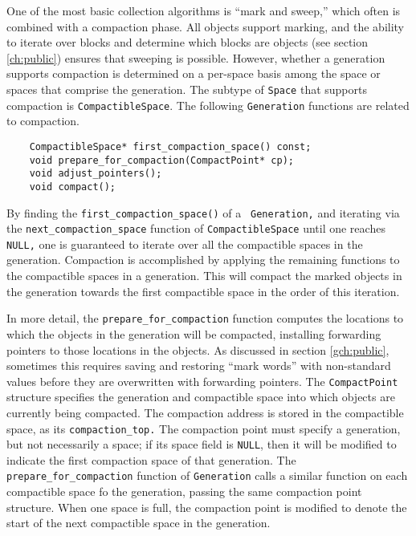 \documentclass{article}
\begin{document}
One of the most basic collection algorithms is ``mark and sweep,''
which often is combined with a compaction phase.  All objects support
marking, and the ability to iterate over blocks and determine which
blocks are objects (see section \ref{ch:public}) ensures that sweeping
is possible.  However, whether a generation supports compaction is
determined on a per-space basis among the space or spaces that
comprise the generation.  The subtype of {\tt Space} that supports
compaction is {\tt CompactibleSpace}.  The following {\tt Generation}
functions are related to compaction.
\begin{verbatim}
    CompactibleSpace* first_compaction_space() const;
    void prepare_for_compaction(CompactPoint* cp);
    void adjust_pointers();
    void compact();
\end{verbatim}
By finding the {\tt first\_compaction\_space()} of a {\tt
Generation,} and iterating via the {\tt next\_compaction\_space}
function of {\tt CompactibleSpace} until one reaches {\tt NULL,} one
is guaranteed to iterate over all the compactible spaces in the
generation.  Compaction is accomplished by applying the remaining
functions to the compactible spaces in a generation.  This will compact
the marked objects in the generation towards the first compactible
space in the order of this iteration.

In more detail, the {\tt prepare\_for\_compaction} function computes the
locations to which the objects in the generation will be compacted,
installing forwarding pointers to those locations in the objects.  As
discussed in section \ref{gch:public}, sometimes this requires saving
and restoring ``mark words'' with non-standard values before they are
overwritten with forwarding pointers.    The {\tt CompactPoint} structure specifies the
generation and compactible space into which objects are currently being
compacted.  The compaction address is stored in the compactible space,
as its {\tt compaction\_top.}    The compaction point must specify a generation, but not
necessarily a space; if its space field is {\tt NULL}, then it will be
modified to indicate the first compaction space of that generation.
The {\tt prepare\_for\_compaction} function of {\tt Generation} calls
a similar function on each compactible space fo the generation,
passing the same compaction point structure.  When one space is full, the
compaction point is modified to denote the start of the next
compactible space in the generation.
\end{document}
